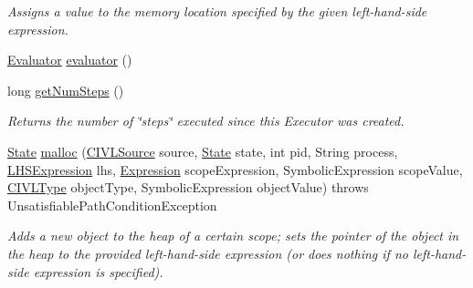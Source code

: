 \begin{DoxyCompactItemize}
\begin{DoxyCompactList}\small\item\em Assigns a value to the memory location specified by the given left-\/hand-\/side expression. \end{DoxyCompactList}\item 
\hyperlink{interfaceedu_1_1udel_1_1cis_1_1vsl_1_1civl_1_1semantics_1_1IF_1_1Evaluator}{Evaluator} \hyperlink{classedu_1_1udel_1_1cis_1_1vsl_1_1civl_1_1semantics_1_1common_1_1CommonExecutor_a106d49d5803a75559199c0cf4bed6598}{evaluator} ()
\item 
long \hyperlink{classedu_1_1udel_1_1cis_1_1vsl_1_1civl_1_1semantics_1_1common_1_1CommonExecutor_aedfa05e23bff4a3933ac10af8a0a22e0}{get\+Num\+Steps} ()
\begin{DoxyCompactList}\small\item\em Returns the number of \char`\"{}steps\char`\"{} executed since this Executor was created. \end{DoxyCompactList}\item 
\hyperlink{interfaceedu_1_1udel_1_1cis_1_1vsl_1_1civl_1_1state_1_1IF_1_1State}{State} \hyperlink{classedu_1_1udel_1_1cis_1_1vsl_1_1civl_1_1semantics_1_1common_1_1CommonExecutor_a148ac749fd4155c39c406904d4fa59fa}{malloc} (\hyperlink{interfaceedu_1_1udel_1_1cis_1_1vsl_1_1civl_1_1model_1_1IF_1_1CIVLSource}{C\+I\+V\+L\+Source} source, \hyperlink{interfaceedu_1_1udel_1_1cis_1_1vsl_1_1civl_1_1state_1_1IF_1_1State}{State} state, int pid, String process, \hyperlink{interfaceedu_1_1udel_1_1cis_1_1vsl_1_1civl_1_1model_1_1IF_1_1expression_1_1LHSExpression}{L\+H\+S\+Expression} lhs, \hyperlink{interfaceedu_1_1udel_1_1cis_1_1vsl_1_1civl_1_1model_1_1IF_1_1expression_1_1Expression}{Expression} scope\+Expression, Symbolic\+Expression scope\+Value, \hyperlink{interfaceedu_1_1udel_1_1cis_1_1vsl_1_1civl_1_1model_1_1IF_1_1type_1_1CIVLType}{C\+I\+V\+L\+Type} object\+Type, Symbolic\+Expression object\+Value)  throws Unsatisfiable\+Path\+Condition\+Exception 
\begin{DoxyCompactList}\small\item\em Adds a new object to the heap of a certain scope; sets the pointer of the object in the heap to the provided left-\/hand-\/side expression (or does nothing if no left-\/hand-\/side expression is specified). \end{DoxyCompactList}\item 

\end{DoxyCompactItemize}

